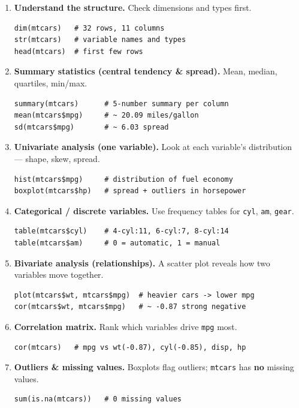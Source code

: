 \documentclass[11pt,a4paper]{article}
\begin{document}
\begin{enumerate}[leftmargin=*,topsep=2pt,itemsep=3pt]
  \item \textbf{Understand the structure.} Check dimensions and types first.
\begin{lstlisting}
dim(mtcars)   # 32 rows, 11 columns
str(mtcars)   # variable names and types
head(mtcars)  # first few rows
\end{lstlisting}

  \item \textbf{Summary statistics (central tendency \& spread).} Mean, median, quartiles, min/max.
\begin{lstlisting}
summary(mtcars)      # 5-number summary per column
mean(mtcars$mpg)     # ~ 20.09 miles/gallon
sd(mtcars$mpg)       # ~ 6.03 spread
\end{lstlisting}

  \item \textbf{Univariate analysis (one variable).} Look at each variable's distribution --- shape, skew, spread.
\begin{lstlisting}
hist(mtcars$mpg)     # distribution of fuel economy
boxplot(mtcars$hp)   # spread + outliers in horsepower
\end{lstlisting}

  \item \textbf{Categorical / discrete variables.} Use frequency tables for \texttt{cyl}, \texttt{am}, \texttt{gear}.
\begin{lstlisting}
table(mtcars$cyl)    # 4-cyl:11, 6-cyl:7, 8-cyl:14
table(mtcars$am)     # 0 = automatic, 1 = manual
\end{lstlisting}

  \item \textbf{Bivariate analysis (relationships).} A scatter plot reveals how two variables move together.
\begin{lstlisting}
plot(mtcars$wt, mtcars$mpg)  # heavier cars -> lower mpg
cor(mtcars$wt, mtcars$mpg)   # ~ -0.87 strong negative
\end{lstlisting}

  \item \textbf{Correlation matrix.} Rank which variables drive \texttt{mpg} most.
\begin{lstlisting}
cor(mtcars)   # mpg vs wt(-0.87), cyl(-0.85), disp, hp
\end{lstlisting}

  \item \textbf{Outliers \& missing values.} Boxplots flag outliers; \texttt{mtcars} has \textbf{no} missing values.
\begin{lstlisting}
sum(is.na(mtcars))   # 0 missing values
\end{lstlisting}
\end{enumerate}
\end{document}
